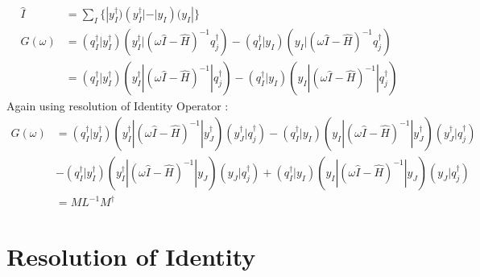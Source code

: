 \documentclass[11pt, oneside]{article}   	%
\begin{document}
\begin{equation*}\label{eq:resolution of identity}
  \begin{aligned}
    \hat I&=\sum_I \{ |y_I^\dagger)(y_I^\dagger|-|y_I)(y_I|\}\\
    G(\omega)&=(q_I^\dagger|y_I^\dagger)(y_I^\dagger|(\omega \hat I - \hat H)^{-1}q_j^\dagger) - (q_I^\dagger|y_I)(y_I|(\omega \hat I - \hat H)^{-1}q_j^\dagger)\\
    &=(q_I^\dagger|y_I^\dagger)(y_I^\dagger|(\omega \hat I - \hat H)^{-1}|q_j^\dagger) - (q_I^\dagger|y_I)(y_I|(\omega \hat I - \hat H)^{-1}|q_j^\dagger)
  \end{aligned}
\end{equation*}
Again using resolution of Identity Operator : 
\begin{equation*}\label{eq:resolution of identity}
  \begin{aligned}
    G(\omega)&=(q_I^\dagger|y_I^\dagger)(y_I^\dagger|(\omega \hat I - \hat H)^{-1}|y_J^\dagger)(y_J^\dagger|q_j^\dagger) - (q_I^\dagger|y_I)(y_I|(\omega \hat I - \hat H)^{-1}|y_J^\dagger)(y_J^\dagger|q_j^\dagger)\\
 &- (q_I^\dagger|y_I^\dagger)(y_I^\dagger|(\omega \hat I - \hat H)^{-1}|y_J)(y_J|q_j^\dagger) + (q_I^\dagger|y_I)(y_I|(\omega \hat I - \hat H)^{-1}|y_J)(y_J|q_j^\dagger)\\
    &=M L^{-1} M^\dagger
  \end{aligned}
\end{equation*}

\section{Resolution of Identity}
\end{document}
